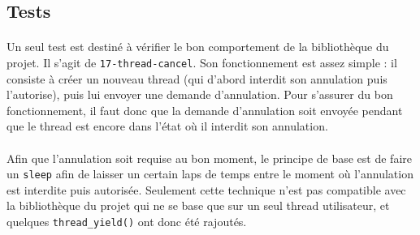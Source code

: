\subsection{Tests}

\paragraph{}
Un seul test est destiné à vérifier le bon comportement de la bibliothèque du projet. Il s'agit de \texttt{17-thread-cancel}. Son fonctionnement est assez simple : il consiste à créer un nouveau thread (qui d'abord interdit son annulation puis l'autorise), puis lui envoyer une demande d'annulation. Pour s'assurer du bon fonctionnement, il faut donc que la demande d'annulation soit envoyée pendant que le thread est encore dans l'état où il interdit son annulation.

\paragraph{}
Afin que l'annulation soit requise au bon moment, le principe de base est de faire un \texttt{sleep} afin de laisser un certain laps de temps entre le moment où l'annulation est interdite puis autorisée. Seulement cette technique n'est pas compatible avec la bibliothèque du projet qui ne se base que sur un seul thread utilisateur, et quelques \texttt{thread\_yield()} ont donc été rajoutés. 